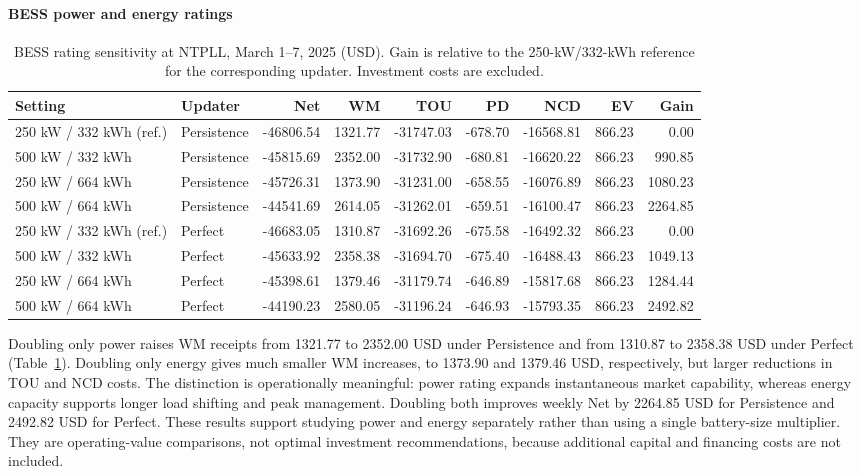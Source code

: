 \documentclass[final,5p,times]{elsarticle}
\begin{document}
\paragraph{BESS power and energy ratings}
\begin{table}[p]
\centering
\caption{BESS rating sensitivity at NTPLL, March 1--7, 2025 (USD). Gain is relative to the 250-kW/332-kWh reference for the corresponding updater. Investment costs are excluded.}
\label{tab:weekly_bess}
\footnotesize
\setlength{\tabcolsep}{3pt}
\begin{tabular}{llrrrrrrr}
\toprule
Setting & Updater & Net & WM & TOU & PD & NCD & EV & Gain \\
\midrule
250 kW / 332 kWh (ref.) & Persistence & -46806.54 & 1321.77 & -31747.03 & -678.70 & -16568.81 & 866.23 & 0.00 \\
500 kW / 332 kWh & Persistence & -45815.69 & 2352.00 & -31732.90 & -680.81 & -16620.22 & 866.23 & 990.85 \\
250 kW / 664 kWh & Persistence & -45726.31 & 1373.90 & -31231.00 & -658.55 & -16076.89 & 866.23 & 1080.23 \\
500 kW / 664 kWh & Persistence & -44541.69 & 2614.05 & -31262.01 & -659.51 & -16100.47 & 866.23 & 2264.85 \\
\midrule
250 kW / 332 kWh (ref.) & Perfect & -46683.05 & 1310.87 & -31692.26 & -675.58 & -16492.32 & 866.23 & 0.00 \\
500 kW / 332 kWh & Perfect & -45633.92 & 2358.38 & -31694.70 & -675.40 & -16488.43 & 866.23 & 1049.13 \\
250 kW / 664 kWh & Perfect & -45398.61 & 1379.46 & -31179.74 & -646.89 & -15817.68 & 866.23 & 1284.44 \\
500 kW / 664 kWh & Perfect & -44190.23 & 2580.05 & -31196.24 & -646.93 & -15793.35 & 866.23 & 2492.82 \\
\bottomrule
\end{tabular}
\end{table}

Doubling only power raises WM receipts from 1321.77 to 2352.00 USD under
Persistence and from 1310.87 to 2358.38 USD under Perfect
(Table~\ref{tab:weekly_bess}). Doubling only energy gives much smaller WM
increases, to 1373.90 and 1379.46 USD, respectively, but larger reductions in
TOU and NCD costs. The distinction is operationally meaningful: power rating
expands instantaneous market capability, whereas energy capacity supports
longer load shifting and peak management. Doubling both improves weekly Net
by 2264.85 USD for Persistence and 2492.82 USD for Perfect. These results
support studying power and energy separately rather than using a single
battery-size multiplier. They are operating-value comparisons, not optimal
investment recommendations, because additional capital and financing costs
are not included.
\end{document}
